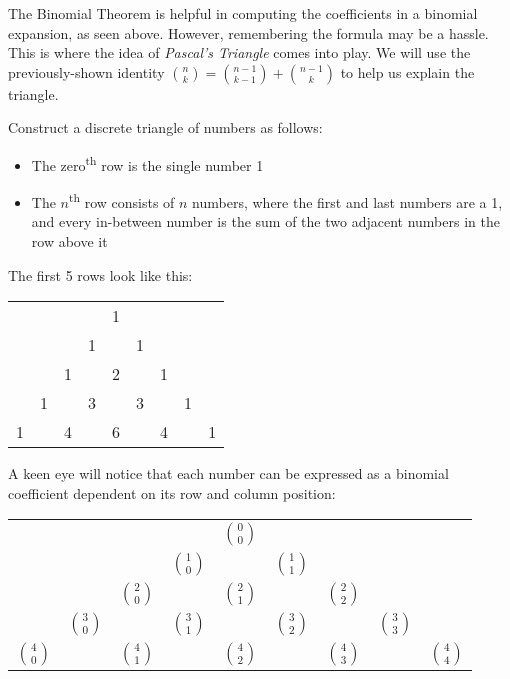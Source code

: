 \documentclass[main.tex]{subfiles}
\begin{document}

The Binomial Theorem is helpful in computing the coefficients in a binomial expansion, as seen above. However, remembering the formula may be a hassle. This is where the idea of \textit{Pascal's Triangle} comes into play. We will use the previously-shown identity \(\binom{n}{k} = \binom{n-1}{k-1} + \binom{n-1}{k}\) to help us explain the triangle.

\begin{defn}
	Construct a discrete triangle of numbers as follows:
	\begin{itemize}
		\item The zero\textsuperscript{th} row is the single number 1
		\item The \(n\)\textsuperscript{th} row consists of \(n\) numbers, where the first and last numbers are a 1, and every in-between number is the sum of the two adjacent numbers in the row above it
	\end{itemize}
\end{defn}

The first 5 rows look like this:
\begin{center}
	\begin{tabular}{ccccccccc}
		&&&& 1 &&&& \\
		&&& 1 && 1 &&& \\
		&& 1 && 2 && 1 && \\
		& 1 && 3 && 3 && 1 & \\
		1 && 4 && 6 && 4 && 1 \\
	\end{tabular}
\end{center}

A keen eye will notice that each number can be expressed as a binomial coefficient dependent on its row and column position:
\begin{center}
	\begin{tabular}{ccccccccc}
		&&&& \(\binom{0}{0}\) &&&& \\
		&&& \(\binom{1}{0}\) && \(\binom{1}{1}\) &&& \\
		&& \(\binom{2}{0}\) && \(\binom{2}{1}\) && \(\binom{2}{2}\) && \\
		& \(\binom{3}{0}\) && \(\binom{3}{1}\) && \(\binom{3}{2}\) && \(\binom{3}{3}\) & \\
		\(\binom{4}{0}\) && \(\binom{4}{1}\) && \(\binom{4}{2}\) && \(\binom{4}{3}\) && \(\binom{4}{4}\) \\
	\end{tabular}
\end{center}
\end{document}
